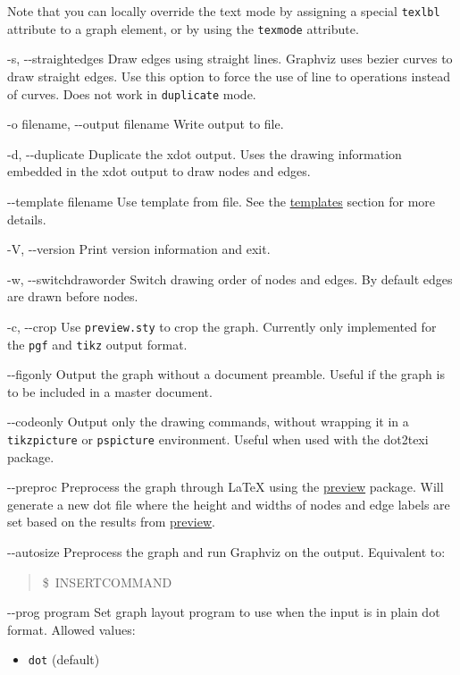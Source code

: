 \documentclass[10pt,a4paper,english]{article}
\newcommand{\optionlistlabel}[1]{\bf #1 \hfill}
\newenvironment{optionlist}[1]
{\begin{list}{}
  {\setlength{\labelwidth}{#1}
   \setlength{\rightmargin}{1cm}
   \setlength{\leftmargin}{\rightmargin}
   \addtolength{\leftmargin}{\labelwidth}
   \addtolength{\leftmargin}{\labelsep}
   \renewcommand{\makelabel}{\optionlistlabel}}
}{\end{list}}
\begin{document}
\begin{optionlist}{3cm}
Note that you can locally override the text mode by assigning a special \texttt{texlbl} attribute to a graph element, or by using the \texttt{texmode} attribute.
\item [-s, -{}-straightedges]  
Draw edges using straight lines. Graphviz uses bezier curves to draw straight edges. Use this option to force the use of line to operations instead of curves. Does not work in \texttt{duplicate} mode.
\item [-o filename, -{}-output filename]  
Write output to file.
\item [-d, -{}-duplicate]  
Duplicate the xdot output. Uses the drawing information embedded in the xdot output to draw nodes and edges.
\item [-{}-template filename]  
Use template from file. See the \href{\#templates}{templates} section for more details.
\item [-V, -{}-version]  
Print version information and exit.
\item [-w, -{}-switchdraworder]  
Switch drawing order of nodes and edges. By default edges are drawn before nodes.
\item [-c, -{}-crop]  
Use \texttt{preview.sty} to crop the graph. Currently only implemented for the \texttt{pgf} and \texttt{tikz} output format.
\item [-{}-figonly]  
Output the graph without a document preamble. Useful if the graph is to be included in a master document.
\item [-{}-codeonly]  
Output only the drawing commands, without wrapping it in a \texttt{tikzpicture} or \texttt{pspicture} environment. Useful when used with the dot2texi package.
\item [-{}-preproc]  
Preprocess the graph through LaTeX using the \href{http://www.ctan.org/tex-archive/help/Catalogue/entries/preview.html}{preview} package. Will generate a new dot file where the height and widths of nodes and edge labels are set based on the results from \href{http://www.ctan.org/tex-archive/help/Catalogue/entries/preview.html}{preview}.
\item [-{}-autosize]  
Preprocess the graph and run Graphviz on the output. Equivalent to:
\begin{quote}{\ttfamily \raggedright \noindent
{\$}~INSERTCOMMAND
}\end{quote}
\item [-{}-prog program]  
Set graph layout program to use when the input is in plain dot format. Allowed values:
\begin{itemize}
\item {} 
\texttt{dot} (default)


\end{itemize}
\end{optionlist}
\end{document}

